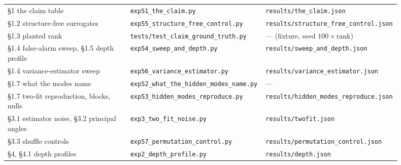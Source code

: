 \documentclass[10pt,letterpaper,twocolumn]{article}
\begin{document}
\begin{center}
{\footnotesize
{}
\tabletail{\midrule}
\tablelasttail{\bottomrule}
\begin{xtabular}{L{0.310\linewidth}L{0.338\linewidth}L{0.248\linewidth}}
§1 the claim table & \texttt{exp51\_\allowbreak{}the\_\allowbreak{}claim.\allowbreak{}py} & \texttt{results/\allowbreak{}the\_\allowbreak{}claim.\allowbreak{}json} \\
§1.2 structure-free surrogates & \texttt{exp55\_\allowbreak{}structure\_\allowbreak{}free\_\allowbreak{}control.\allowbreak{}py} & \texttt{results/\allowbreak{}structure\_\allowbreak{}free\_\allowbreak{}control.\allowbreak{}json} \\
§1.3 planted rank & \texttt{tests/\allowbreak{}test\_\allowbreak{}claim\_\allowbreak{}ground\_\allowbreak{}truth.\allowbreak{}py} & --- (fixture, seed \(100\times\text{rank}\)) \\
§1.4 false-alarm sweep, §1.5 depth profile & \texttt{exp54\_\allowbreak{}sweep\_\allowbreak{}and\_\allowbreak{}depth.\allowbreak{}py} & \texttt{results/\allowbreak{}sweep\_\allowbreak{}and\_\allowbreak{}depth.\allowbreak{}json} \\
§1.4 variance-estimator sweep & \texttt{exp56\_\allowbreak{}variance\_\allowbreak{}estimator.\allowbreak{}py} & \texttt{results/\allowbreak{}variance\_\allowbreak{}estimator.\allowbreak{}json} \\
§1.7 what the modes name & \texttt{exp52\_\allowbreak{}what\_\allowbreak{}the\_\allowbreak{}hidden\_\allowbreak{}modes\_\allowbreak{}name.\allowbreak{}py} & --- \\
§1.7 two-fit reproduction, blocks, nulls & \texttt{exp53\_\allowbreak{}hidden\_\allowbreak{}modes\_\allowbreak{}reproduce.\allowbreak{}py} & \texttt{results/\allowbreak{}hidden\_\allowbreak{}modes\_\allowbreak{}reproduce.\allowbreak{}json} \\
§3.1 estimator noise, §3.2 principal angles & \texttt{exp3\_\allowbreak{}two\_\allowbreak{}fit\_\allowbreak{}noise.\allowbreak{}py} & \texttt{results/\allowbreak{}twofit.\allowbreak{}json} \\
§3.3 shuffle controls & \texttt{exp57\_\allowbreak{}permutation\_\allowbreak{}control.\allowbreak{}py} & \texttt{results/\allowbreak{}permutation\_\allowbreak{}control.\allowbreak{}json} \\
§4, §4.1 depth profiles & \texttt{exp2\_\allowbreak{}depth\_\allowbreak{}profile.\allowbreak{}py} & \texttt{results/\allowbreak{}depth.\allowbreak{}json} \\

\end{xtabular}}
\end{center}
\end{document}
